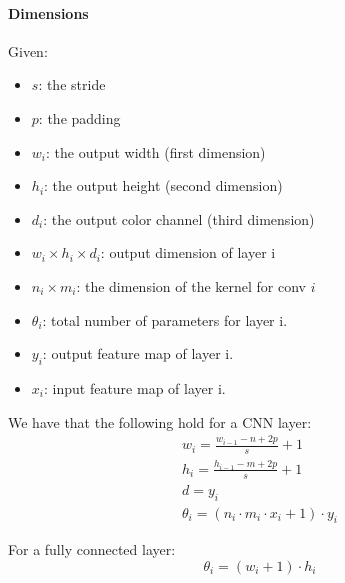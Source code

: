 \paragraph{Dimensions}
Given:
\begin{itemize}
\item $s$: the stride 
\item $p$: the padding
\item $w_i$: the output width (first dimension)
\item $h_i$: the output height (second dimension)
\item $d_i$: the output color channel (third dimension)
\item $w_i\times h_i\times d_i$: output dimension of layer i
\item $n_i\times m_i$: the dimension of the kernel for conv $i$
\item $\theta_i$: total number of parameters for layer i.
\item $y_i$: output feature map of layer i.
\item $x_i$: input feature map of layer i.
\end{itemize}

We have that the following hold for a CNN layer:
\begin{equation}
\begin{aligned}
w_i=\frac{w_{i-1}-n+2p}{s}+1\\
h_i=\frac{h_{i-1}-m+2p}{s}+1\\
d=y_i\\
\theta_i=(n_i\cdot m_i \cdot x_i+1)\cdot  y_i 
\end{aligned}
\end{equation}

For a fully connected layer:
$$\theta_i=(w_i +1)\cdot h_i $$

